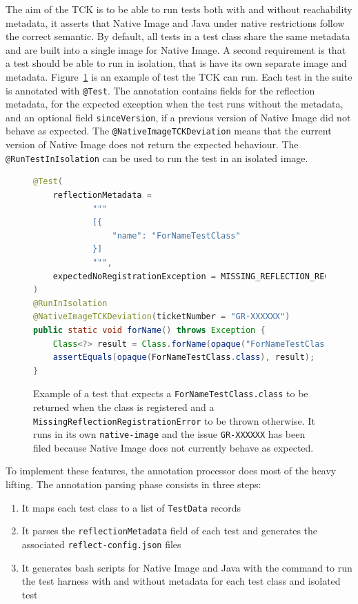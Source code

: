 The aim of the TCK is to be able to run tests both with and without reachability metadata, it asserts that Native Image and Java under native restrictions follow the correct semantic. By default, all tests in a test class share the same metadata and are built into a single image for Native Image. A second requirement is that a test should be able to run in isolation, that is have its own separate image and metadata. 
Figure~\ref{fig:tck_for_name} is an example of test the TCK can run. Each test in the suite is annotated with \verb|@Test|. The annotation contains fields for the reflection metadata, for the expected exception when the test runs without the metadata, and an optional field \verb|sinceVersion|, if a previous version of Native Image did not behave as expected. The \verb|@NativeImageTCKDeviation| means that the current version of Native Image does not return the expected behaviour. The \verb|@RunTestInIsolation| can be used to run the test in an isolated image. 

\begin{figure}[ht]
    \centering
\begin{lstlisting}[language=Java]
@Test(
    reflectionMetadata =
            """
            [{
                "name": "ForNameTestClass"
            }]
            """,
    expectedNoRegistrationException = MISSING_REFLECTION_REGISTRATION_ERROR
)
@RunInIsolation
@NativeImageTCKDeviation(ticketNumber = "GR-XXXXXX")
public static void forName() throws Exception {
    Class<?> result = Class.forName(opaque("ForNameTestClass"));
    assertEquals(opaque(ForNameTestClass.class), result);
}
\end{lstlisting}
    \caption{Example of a test that expects a \texttt{ForNameTestClass.class} to be returned when the class is registered and a \texttt{MissingReflectionRegistrationError} to be thrown otherwise. It runs in its own \texttt{native-image} and the issue \texttt{GR-XXXXXX} has been filed because Native Image does not currently behave as expected.}
    \label{fig:tck_for_name}
\end{figure}

To implement these features, the annotation processor does most of the heavy lifting. The annotation parsing phase consists in three steps:
\begin{enumerate}
    \item It maps each test class to a list of \verb|TestData| records 
    \item It parses the \verb|reflectionMetadata| field of each test and generates the associated \verb|reflect-config.json| files
    \item It generates bash scripts for Native Image and Java with the command to run the test harness with and without metadata for each test class and isolated test
\end{enumerate}


